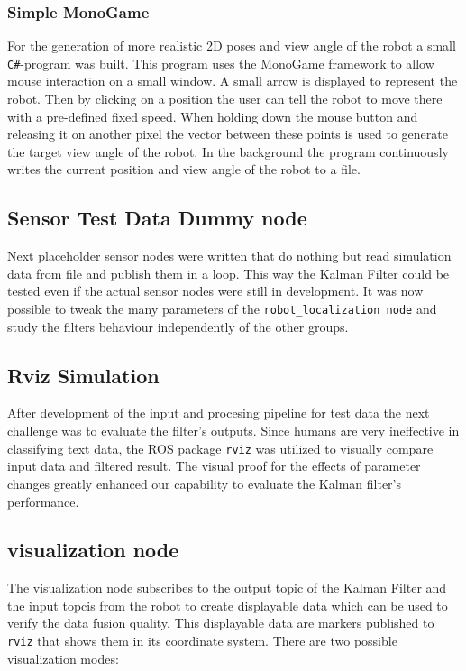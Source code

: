\subsubsection{Simple MonoGame}
For the generation of more realistic 2D poses and view angle of the robot a small \texttt{C\#}-program was built. This program uses the MonoGame framework to allow mouse interaction on a small window. A small arrow is displayed to represent the robot. Then by clicking on a position the user can tell the robot to move there with a pre-defined fixed speed. When holding down the mouse button and releasing it on another pixel the vector between these points is used to generate the target view angle of the robot. In the background the program continuously writes the current position and view angle of the robot to a file.

\subsection{Sensor Test Data Dummy node}
Next placeholder sensor nodes were written that do nothing but read simulation data from file and publish them in a loop. This way the Kalman Filter could be tested even if the actual sensor nodes were still in development. It was now possible to tweak the many parameters of the \texttt{robot\_localization node} and study the filters behaviour independently of the other groups.

\subsection{Rviz Simulation}
After development of the input and procesing pipeline for test data the next challenge was to evaluate the filter's outputs. Since humans are very ineffective in classifying text data, the ROS package \texttt{rviz} was utilized to visually compare input data and filtered result. The visual proof for the effects of parameter changes greatly enhanced our capability to evaluate the Kalman filter's performance.

\subsection{visualization node}
The visualization node subscribes to the output topic of the Kalman Filter and the input topcis from the robot to create displayable data which can be used to verify the data fusion quality. This displayable data are markers published to \texttt{rviz} that shows them in its coordinate system. There are two possible visualization modes:

